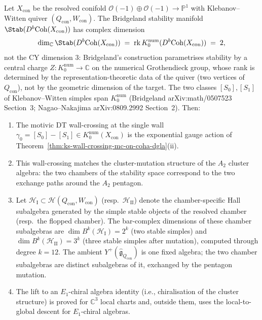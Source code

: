 \begin{theorem}
\label{thm:conifold-cluster-wall-crossing}
Let $X_{\mathrm{con}}$ be the resolved conifold
$\mathcal{O}(-1) \oplus \mathcal{O}(-1) \to \mathbb{P}^1$ with
Klebanov--Witten quiver $(Q_{\mathrm{con}}, W_{\mathrm{con}})$. The
Bridgeland stability manifold
$\Stab(D^b\mathrm{Coh}(X_{\mathrm{con}}))$ has complex dimension
\[
 \dim_{\mathbb{C}} \Stab(D^b\mathrm{Coh}(X_{\mathrm{con}}))
 \;=\; \mathrm{rk}\, K_0^{\mathrm{num}}(D^b\mathrm{Coh}(X_{\mathrm{con}}))
 \;=\; 2,
\]
not the CY dimension $3$: Bridgeland's construction parametrises
stability by a central charge $Z \colon K_0^{\mathrm{num}} \to
\mathbb{C}$ on the numerical Grothendieck group, whose rank is
determined by the representation-theoretic data of the quiver (two
vertices of $Q_{\mathrm{con}}$), not by the geometric dimension of
the target. The two classes $[S_0], [S_1]$ of Klebanov--Witten
simples span $K_0^{\mathrm{num}}$ (Bridgeland \textup{arXiv:math/0507523}
Section~3; Nagao--Nakajima \textup{arXiv:0809.2992} Section~2). Then:
\begin{enumerate}[label=\textup{(\roman*)}]
 \item The motivic DT wall-crossing at the single wall
 $\gamma_0 = [S_0] - [S_1] \in K_0^{\mathrm{num}}(X_{\mathrm{con}})$
 is the exponential gauge action of
 Theorem~\ref{thm:ks-wall-crossing-mc-on-coha-dgla}(ii).
 \item This wall-crossing matches the cluster-mutation structure of
 the $A_2$ cluster algebra: the two chambers of the stability space
 correspond to the two exchange paths around the $A_2$ pentagon.
 \item Let $\mathcal{H}_{\mathrm{I}} \subset \mathcal{H}(Q_{\mathrm{con}},
 W_{\mathrm{con}})$ (resp.\ $\mathcal{H}_{\mathrm{II}}$) denote the
 chamber-specific Hall subalgebra generated by the simple stable
 objects of the resolved chamber (resp.\ the flopped chamber). The
 bar-complex dimensions of these chamber subalgebras are
 $\dim B^k(\mathcal{H}_{\mathrm{I}}) = 2^k$ (two stable simples) and
 $\dim B^k(\mathcal{H}_{\mathrm{II}}) = 3^k$ (three stable simples
 after mutation), computed through degree \(k=12\). The
 ambient $Y^+(\widehat{\mathfrak{g}}_{Q_{\mathrm{con}}})$ is one fixed
 algebra; the two chamber subalgebras are distinct subalgebras of it,
 exchanged by the pentagon mutation.
 \item The lift to an $E_1$-chiral algebra identity (i.e.,
 chiralisation of the cluster structure) is proved for $\mathbb{C}^3$
 local charts and, outside them, uses the local-to-global descent for
 $E_1$-chiral algebras.
\end{enumerate}
\end{theorem}

